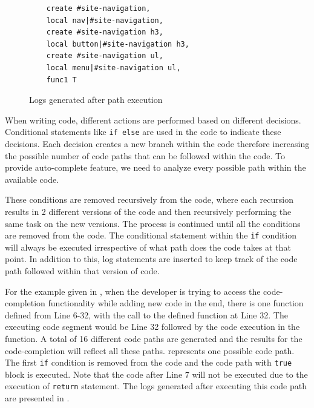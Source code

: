 			
			\begin{figure}
			\medskip
			\begin{lstlisting}
	create #site-navigation, 
	local nav|#site-navigation, 
	create #site-navigation h3, 
	local button|#site-navigation h3, 
	create #site-navigation ul, 
	local menu|#site-navigation ul, 
	func1 T 
			\end{lstlisting}
			\caption{Logs generated after path execution}
			\label{Fig:Logs}
			\end{figure}
			
		
		When writing code, different actions are performed based on different decisions. Conditional statements like \texttt{if else} are used in the code to indicate these decisions. Each decision creates a new branch within the code therefore increasing the possible number of code paths that can be followed within the code. To provide auto-complete feature, we need to analyze every possible path within the available \javascript code.
		
		These conditions are removed recursively from the code, where each recursion results in 2 different versions of the code and then recursively performing the same task on the new versions. The process is continued until all the conditions are removed from the code. The conditional statement within the \texttt{if} condition will always be executed irrespective of what path does the code takes at that point. In addition to this, log statements are inserted to keep track of the code path followed within that version of code.
		
		For the example given in , when the developer is trying to access the code-completion functionality while adding new code in the end, there is one function defined from Line 6-32, with the call to the defined function at Line 32. The executing code segment would be Line 32 followed by the code execution in the function. A total of 16 different code paths are generated and the results for the code-completion will reflect all these paths.  represents one possible code path. The first \texttt{if} condition is removed from the code and the code path with \texttt{true} block is executed. Note that the code after Line 7 will not be executed due to the execution of \texttt{return} statement. The logs generated after executing this code path are presented in .	
		
